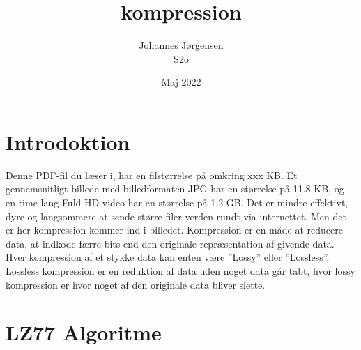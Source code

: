 \documentclass[12pt]{article}
\begin{document}
\title{kompression}
\author{Johannes Jørgensen\\ S2o}
\date{Maj 2022}
\maketitle
\pagebreak
\tableofcontents
\pagebreak

\section{Introdoktion}
Denne PDF-fil du læser i, har en filstørrelse på omkring xxx KB. 
Et gennemsnitligt billede med billedformaten JPG har en størrelse på 11.8 KB,\cite*{Solarwinds/filesizes} og en time lang Fuld HD-video har en størrelse på 1.2 GB.\cite*{filecatalyst/movesizes} 
Det er mindre effektivt, dyre og langsommere at sende større filer verden rundt via internettet. Men det er her kompression kommer ind i billedet. 
Kompression er en måde at reducere data, at indkode færre bits end den originale repræsentation af givende data. Hver kompression af et stykke data kan enten være ”Lossy” eller ”Lossless”.\cite*{Wiki/dataCompression} 
Lossless kompression er en reduktion af data uden noget data går tabt, hvor lossy kompression er hvor noget af den originale data bliver slette.
\section{LZ77 Algoritme}
\end{document}
